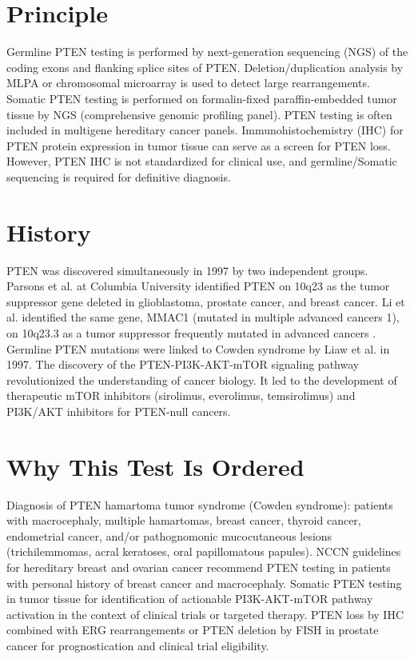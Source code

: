 \section*{Principle}
Germline PTEN testing is performed by next-generation sequencing (NGS) of the coding exons and flanking splice sites of PTEN. Deletion/duplication analysis by MLPA or chromosomal microarray is used to detect large rearrangements. Somatic PTEN testing is performed on formalin-fixed paraffin-embedded tumor tissue by NGS (comprehensive genomic profiling panel). PTEN testing is often included in multigene hereditary cancer panels. Immunohistochemistry (IHC) for PTEN protein expression in tumor tissue can serve as a screen for PTEN loss. However, PTEN IHC is not standardized for clinical use, and germline/Somatic sequencing is required for definitive diagnosis.

\section*{History}
PTEN was discovered simultaneously in 1997 by two independent groups. Parsons et al. at Columbia University identified PTEN on 10q23 as the tumor suppressor gene deleted in glioblastoma, prostate cancer, and breast cancer. Li et al. identified the same gene, MMAC1 (mutated in multiple advanced cancers 1), on 10q23.3 as a tumor suppressor frequently mutated in advanced cancers \cite{li1997pten}. Germline PTEN mutations were linked to Cowden syndrome by Liaw et al. in 1997. The discovery of the PTEN-PI3K-AKT-mTOR signaling pathway revolutionized the understanding of cancer biology. It led to the development of therapeutic mTOR inhibitors (sirolimus, everolimus, temsirolimus) and PI3K/AKT inhibitors for PTEN-null cancers.

\section*{Why This Test Is Ordered}
Diagnosis of PTEN hamartoma tumor syndrome (Cowden syndrome): patients with macrocephaly, multiple hamartomas, breast cancer, thyroid cancer, endometrial cancer, and/or pathognomonic mucocutaneous lesions (trichilemmomas, acral keratoses, oral papillomatous papules). NCCN guidelines for hereditary breast and ovarian cancer recommend PTEN testing in patients with personal history of breast cancer and macrocephaly. Somatic PTEN testing in tumor tissue for identification of actionable PI3K-AKT-mTOR pathway activation in the context of clinical trials or targeted therapy. PTEN loss by IHC combined with ERG rearrangements or PTEN deletion by FISH in prostate cancer for prognostication and clinical trial eligibility.

